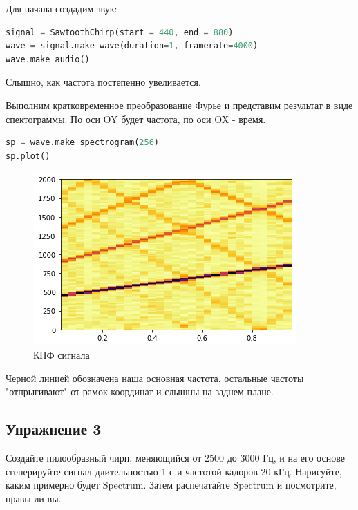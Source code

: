 Для начала создадим звук:

\begin{lstlisting}[language=Python]
signal = SawtoothChirp(start = 440, end = 880)
wave = signal.make_wave(duration=1, framerate=4000)
wave.make_audio()
\end{lstlisting}

Слышно, как частота постепенно увеливается.

Выполним кратковременное преобразование Фурье и представим результат в виде спектограммы. По оси OY будет частота, по оси OX - время.

\begin{lstlisting}[language=Python]
sp = wave.make_spectrogram(256)
sp.plot()
\end{lstlisting}
\begin{figure}[H]
	\begin{center}
		\includegraphics[scale=1]{fig/lab03/lab3_6.png}
		\caption{КПФ сигнала}
	\end{center}
\end{figure}

Черной линией обозначена наша основная частота, остальные частоты "отпрыгивают" от рамок координат и слышны на заднем плане.

\subsection{Упражнение 3}

Создайте пилообразный чирп, меняющийся от 2500 до 3000 Гц, и на его основе сгенерируйте сигнал длительностью 1 с и частотой кадоров 20 кГц. Нарисуйте, каким примерно будет Spectrum. Затем распечатайте Spectrum и посмотрите, правы ли вы.

